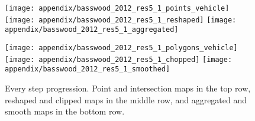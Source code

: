 
\appendixtitle 
\appendix

\unappendixtitle
\singleappendixtitle


\begin{figure}
    \centering
    \begin{minipage}{0.49\textwidth}
        \centering
        \texttt{[image: appendix/basswood\_2012\_res5\_1\_points\_vehicle]}
        \texttt{[image: appendix/basswood\_2012\_res5\_1\_reshaped]}
        \texttt{[image: appendix/basswood\_2012\_res5\_1\_aggregated]}
    \end{minipage}\hfill
    \begin{minipage}{0.49\textwidth}
        \centering
        \texttt{[image: appendix/basswood\_2012\_res5\_1\_polygons\_vehicle]}
        \texttt{[image: appendix/basswood\_2012\_res5\_1\_chopped]}
        \texttt{[image: appendix/basswood\_2012\_res5\_1\_smoothed]}
    \end{minipage}
    \caption[Step-by-step visualization of the algorithm for one field]{Every step progression. Point and intersection maps
      in the top row, reshaped and clipped maps in the middle row, and
    aggregated and smooth maps in the bottom row.}
    \label{fig:basswood2012-all-steps}
\end{figure}


